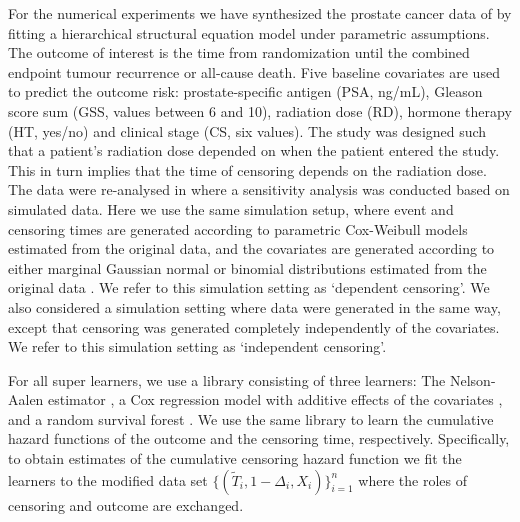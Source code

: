 \documentclass[alpha-refs]{wiley-article}
\newcommand{\1}{\mathds{1}}
\begin{document}
For the numerical experiments we have synthesized the prostate cancer
data of \cite{kattan2000pretreatment} by fitting a hierarchical
structural equation model under parametric assumptions. The outcome of
interest is the time from randomization until the combined endpoint
tumour recurrence or all-cause death. Five baseline covariates are
used to predict the outcome risk: prostate-specific antigen (PSA,
ng/mL), Gleason score sum (GSS, values between 6 and 10), radiation
dose (RD), hormone therapy (HT, yes/no) and clinical stage (CS, six
values). The study was designed such that a patient's radiation dose
depended on when the patient entered the study. This in turn implies
that the time of censoring depends on the radiation dose. The data
were re-analysed in \citep{gerds2013estimating} where a sensitivity
analysis was conducted based on simulated data. Here we use the same
simulation setup, where event and censoring times are generated
according to parametric Cox-Weibull models \citep{Bender2005}
estimated from the original data, and the covariates are generated
according to either marginal Gaussian normal or binomial distributions
estimated from the original data
\citep[c.f.,][Section~4.6]{gerds2013estimating}. We refer to this
simulation setting as `dependent censoring'. We also considered a
simulation setting where data were generated in the same way, except
that censoring was generated completely independently of the
covariates. We refer to this simulation setting as `independent
censoring'.

For all super learners, we use a library consisting of three learners:
The Nelson-Aalen estimator \citep{andersen2012statistical}, a Cox
regression model with additive effects of the covariates
\citep{cox1972regression}, and a random survival forest
\citep{ishwaran2008random}. We use the same library to learn the
cumulative hazard functions of the outcome and the censoring time,
respectively. Specifically, to obtain estimates of the cumulative
censoring hazard function we fit the learners to the modified data set
\(\{(\tilde{T}_i, 1-\Delta_i, X_i)\}_{i=1}^n \) where the roles of
censoring and outcome are exchanged.
\end{document}
